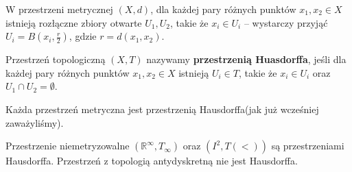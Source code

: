 \begin{remark}
	W przestrzeni metrycznej $\left( X,d \right) $, dla każdej pary różnych punktów $x_1,x_2 \in X$ istnieją rozłączne zbiory otwarte $U_1,U_2$, takie że $x_{i} \in U_{i}$ -- wystarczy przyjąć $U_{i} = B\left( x_{i}, \frac{r}{2} \right) $, gdzie $r = d\left( x_1,x_2 \right) $.
\end{remark} 

\begin{definition}
	Przestrzeń topologiczną $\left( X,T \right) $ nazywamy \textbf{przestrzenią Huasdorffa}, jeśli dla każdej pary różnych punktów $x_1,x_2 \in X$ istnieją $U_{i} \in T$, takie że $x_{i}\in U_{i}$ oraz $U_1\cap U_2 = \emptyset$.
\end{definition} 

\begin{remark}
\noindent Każda przestrzeń metryczna jest przestrzenią Hausdorffa(jak już wcześniej zaważyliśmy).

	Przestrzenie niemetryzowalne $\left( \mathbb{R}^{\infty}, T_{\infty} \right) $ oraz $\left( I^2, T\left( < \right)  \right) $ są przestrzeniami Hausdorffa. Przestrzeń z topologią antydyskretną nie jest Hausdorffa.
\end{remark} 
